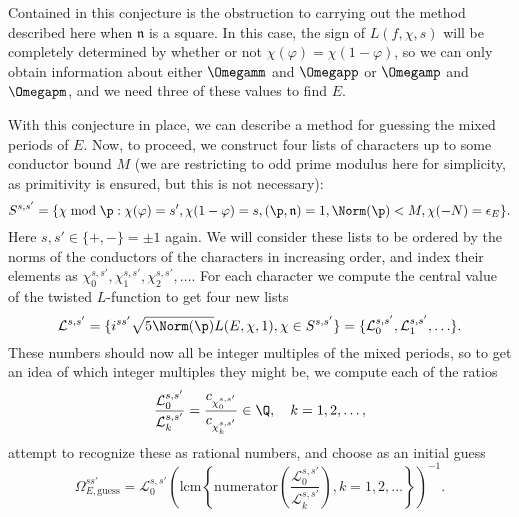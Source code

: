 \documentclass{amsart}
\newcommand{\n}{\mathfrak{n}}
\renewcommand{\phi}{\varphi}
\begin{document}
\begin{remark}
Contained in this conjecture is the obstruction to carrying out the method described here when 
$\n$ is a square. In this case, the sign of $L(f, \chi, s)$ will be completely determined by
whether or not $\chi(\varphi) = \chi(1 - \varphi)$, so we can only obtain information about
either $\Omegamm$ and $\Omegapp$ or $\Omegamp$ and $\Omegapm$, and we need three of these
values to find $E$.
\end{remark}

With this conjecture in place, we can describe a method for guessing the mixed periods of
$E$.
Now, to proceed, we construct four lists of characters
up to some conductor bound $M$ (we are restricting to odd prime modulus here for simplicity,
as primitivity is ensured, but this is not necessary):
\[
    S^{s,s'} = \{ \chi \bmod \p : \chi(\phi) = s', \chi(1 - \phi) = s,
            (\p, \n) = 1, \Norm(\p) < M, \chi(-N) = \epsilon_E\}.
\]
Here $s, s' \in \{+, -\} = \pm 1$ again. We will consider these lists to be ordered by the
norms of the conductors of the characters in increasing order, and index their elements as
$\chi^{s,s'}_0, \chi^{s,s'}_1, \chi^{s,s'}_2, \ldots$. For each character we compute the central
value of the twisted $L$-function to get four new lists
\[
    \mathcal{L}^{s,s'} = \{ i^{ss'}\sqrt{5 \Norm(\p) } L(E,\chi,1), \chi \in S^{s,s'}\} =
        \{\mathcal{L}^{s,s'}_0, \mathcal{L}^{s,s'}_1, \ldots\}.
\]
These numbers should now all be integer multiples of the mixed periods, so to get an idea
of which integer multiples they might be, we compute each of the ratios 
\[
    \frac{\mathcal{L}^{s,s'}_0}{\mathcal{L}^{s,s'}_k} = \frac{c_{\chi^{s,s'}_0}}{c_{\chi^{s,s'}_k}} \in \Q,\quad  k = 1, 2, \ldots,
\]
attempt to recognize these as rational numbers, and 
choose as an initial guess
\[
    \Omega^{ss'}_{E, \mathrm{guess}} = \mathcal{L}^{s,s'}_0\left(\mathrm{lcm}\left\{ \mathrm{numerator}\left(\frac{\mathcal{L}^{s,s'}_0}{\mathcal{L}^{s,s'}_k}\right), k = 1,2, \ldots \right\}\right)^{-1}.
\]
\end{document}
